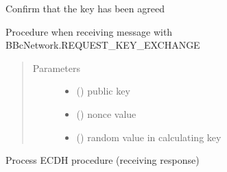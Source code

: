 \documentclass[letterpaper,10pt,english]{sphinxmanual}
\begin{document}
\begin{fulllineitems}

\begin{fulllineitems}
\label{\detokenize{bbc1.core.key_exchange_manager:bbc1.core.key_exchange_manager.KeyExchangeManager.receive_confirmation}}
Confirm that the key has been agreed

\end{fulllineitems}


\begin{fulllineitems}
\label{\detokenize{bbc1.core.key_exchange_manager:bbc1.core.key_exchange_manager.KeyExchangeManager.receive_exchange_request}}
Procedure when receiving message with BBcNetwork.REQUEST\_KEY\_EXCHANGE
\begin{quote}\begin{description}
\item[{Parameters}] \leavevmode\begin{itemize}
\item {} 
 () \textendash{} public key

\item {} 
 () \textendash{} nonce value

\item {} 
 () \textendash{} random value in calculating key

\end{itemize}

\end{description}\end{quote}

\end{fulllineitems}


\begin{fulllineitems}
\label{\detokenize{bbc1.core.key_exchange_manager:bbc1.core.key_exchange_manager.KeyExchangeManager.receive_exchange_response}}
Process ECDH procedure (receiving response)


\end{fulllineitems}
\end{fulllineitems}
\end{document}
